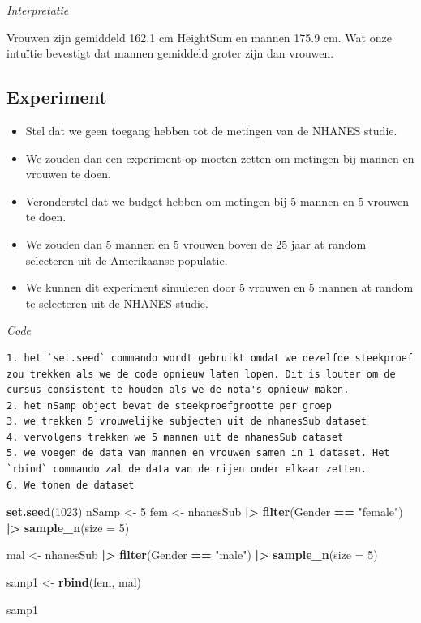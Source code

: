 \documentclass[
  12pt,dutch]{book}
\newenvironment{Shaded}{\begin{snugshade}}{\end{snugshade}}
\newcommand{\AttributeTok}[1]{\textcolor[rgb]{0.13,0.29,0.53}{#1}}
\newcommand{\DecValTok}[1]{\textcolor[rgb]{0.00,0.00,0.81}{#1}}
\newcommand{\FunctionTok}[1]{\textcolor[rgb]{0.13,0.29,0.53}{\textbf{#1}}}
\newcommand{\NormalTok}[1]{#1}
\newcommand{\OtherTok}[1]{\textcolor[rgb]{0.56,0.35,0.01}{#1}}
\newcommand{\SpecialCharTok}[1]{\textcolor[rgb]{0.81,0.36,0.00}{\textbf{#1}}}
\newcommand{\StringTok}[1]{\textcolor[rgb]{0.31,0.60,0.02}{#1}}
\theoremstyle{definition}
\theoremstyle{definition}
\theoremstyle{definition}
\theoremstyle{definition}
\theoremstyle{remark}
\begin{document}
\emph{Interpretatie}

Vrouwen zijn gemiddeld 162.1 cm HeightSum en mannen 175.9 cm.
Wat onze intuïtie bevestigt dat mannen gemiddeld groter zijn dan vrouwen.

\subsection{Experiment}\label{experiment}

\begin{itemize}
\item
  Stel dat we geen toegang hebben tot de metingen van de NHANES studie.
\item
  We zouden dan een experiment op moeten zetten om metingen bij mannen en vrouwen te doen.
\item
  Veronderstel dat we budget hebben om metingen bij 5 mannen en 5 vrouwen te doen.
\item
  We zouden dan 5 mannen en 5 vrouwen boven de 25 jaar at random selecteren uit de Amerikaanse populatie.
\item
  We kunnen dit experiment simuleren door 5 vrouwen en 5 mannen at random te selecteren uit de NHANES studie.
\end{itemize}

\emph{Code}

\begin{verbatim}
1. het `set.seed` commando wordt gebruikt omdat we dezelfde steekproef zou trekken als we de code opnieuw laten lopen. Dit is louter om de cursus consistent te houden als we de nota's opnieuw maken.
2. het nSamp object bevat de steekproefgrootte per groep
3. we trekken 5 vrouwelijke subjecten uit de nhanesSub dataset
4. vervolgens trekken we 5 mannen uit de nhanesSub dataset
5. we voegen de data van mannen en vrouwen samen in 1 dataset. Het `rbind` commando zal de data van de rijen onder elkaar zetten.
6. We tonen de dataset
\end{verbatim}

\begin{Shaded}
\begin{Highlighting}[]
\FunctionTok{set.seed}\NormalTok{(}\DecValTok{1023}\NormalTok{)}
\NormalTok{nSamp }\OtherTok{\textless{}{-}} \DecValTok{5}
\NormalTok{fem }\OtherTok{\textless{}{-}}\NormalTok{ nhanesSub }\SpecialCharTok{|\textgreater{}}
    \FunctionTok{filter}\NormalTok{(Gender }\SpecialCharTok{==} \StringTok{"female"}\NormalTok{) }\SpecialCharTok{|\textgreater{}}
    \FunctionTok{sample\_n}\NormalTok{(}\AttributeTok{size =} \DecValTok{5}\NormalTok{)}

\NormalTok{mal }\OtherTok{\textless{}{-}}\NormalTok{ nhanesSub }\SpecialCharTok{|\textgreater{}}
    \FunctionTok{filter}\NormalTok{(Gender }\SpecialCharTok{==} \StringTok{"male"}\NormalTok{) }\SpecialCharTok{|\textgreater{}}
    \FunctionTok{sample\_n}\NormalTok{(}\AttributeTok{size =} \DecValTok{5}\NormalTok{)}

\NormalTok{samp1 }\OtherTok{\textless{}{-}} \FunctionTok{rbind}\NormalTok{(fem, mal)}

\NormalTok{samp1}
\end{Highlighting}
\end{Shaded}
\end{document}
